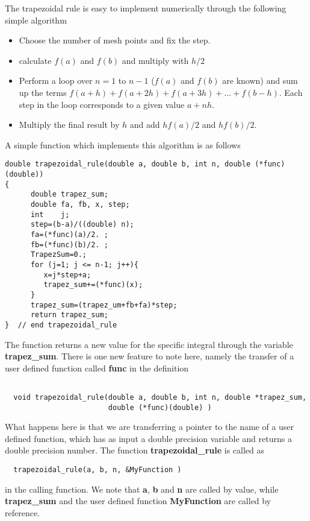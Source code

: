 The trapezoidal rule is easy to  implement numerically 
through the following simple algorithm
\begin{svgraybox}
\begin{itemize}
   \item Choose the number of mesh points and fix the step.
   \item calculate $f(a)$ and $f(b)$ and multiply with $h/2$
   \item Perform a loop over $n=1$ to $n-1$ ($f(a)$ and $f(b)$ are known) and sum up
         the terms $f(a+h) +f(a+2h)+f(a+3h)+\dots +f(b-h)$. Each step in the loop
         corresponds to a given value $a+nh$. 
   \item Multiply the final result by $h$ and add $hf(a)/2$ and $hf(b)/2$.
\end{itemize}
\end{svgraybox}
A simple function which implements this algorithm is as follows
\lstset{language=c++}
\begin{lstlisting}[title={\url{http://folk.uio.no/mhjensen/compphys/programs/chapter05/cpp/trapezoidal.cpp}}]
double trapezoidal_rule(double a, double b, int n, double (*func)(double))
{
      double trapez_sum;
      double fa, fb, x, step;
      int    j;
      step=(b-a)/((double) n);
      fa=(*func)(a)/2. ;
      fb=(*func)(b)/2. ;
      TrapezSum=0.;
      for (j=1; j <= n-1; j++){
         x=j*step+a;
         trapez_sum+=(*func)(x);
      }
      trapez_sum=(trapez_um+fb+fa)*step;
      return trapez_sum;
}  // end trapezoidal_rule 
\end{lstlisting}
The function returns a new value for the specific integral through the variable
{\bf trapez\_sum}. There is one new feature to note here, namely
the transfer of a user defined function called {\bf func} in the 
definition 
\begin{lstlisting}

  void trapezoidal_rule(double a, double b, int n, double *trapez_sum, 
                        double (*func)(double) )       
\end{lstlisting}

What happens here is that we are transferring a pointer to the name 
of a user defined
function, which has as input a double precision variable and returns
a double precision number. The function 
{\bf trapezoidal\_rule} is called as
\begin{lstlisting}
  trapezoidal_rule(a, b, n, &MyFunction )       
\end{lstlisting}
in the calling function. We note that {\bf a}, {\bf b} and {\bf n} are called by value,
while {\bf trapez\_sum} and the user defined function {\bf MyFunction}
are called by reference. 

